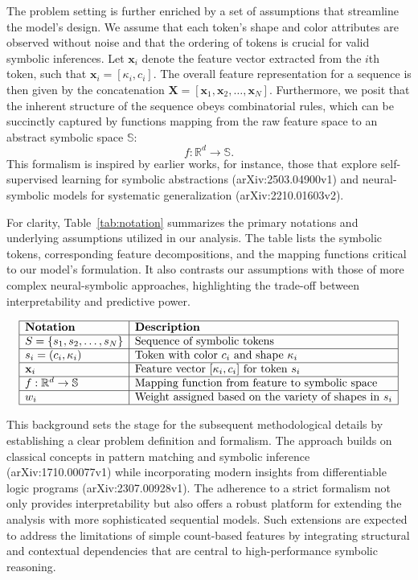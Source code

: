 \documentclass{article}
\begin{document}
The problem setting is further enriched by a set of assumptions that streamline the model’s design. We assume that each token's shape and color attributes are observed without noise and that the ordering of tokens is crucial for valid symbolic inferences. Let \( \mathbf{x}_i \) denote the feature vector extracted from the \(i\)th token, such that \( \mathbf{x}_i = [\kappa_i, c_i] \). The overall feature representation for a sequence is then given by the concatenation \( \mathbf{X} = [\mathbf{x}_1, \mathbf{x}_2, \ldots, \mathbf{x}_N] \). Furthermore, we posit that the inherent structure of the sequence obeys combinatorial rules, which can be succinctly captured by functions mapping from the raw feature space to an abstract symbolic space \(\mathbb{S}\):
\[
f: \mathbb{R}^{d} \rightarrow \mathbb{S}.
\]
This formalism is inspired by earlier works, for instance, those that explore self-supervised learning for symbolic abstractions (arXiv:2503.04900v1) and neural-symbolic models for systematic generalization (arXiv:2210.01603v2).

For clarity, Table~\ref{tab:notation} summarizes the primary notations and underlying assumptions utilized in our analysis. The table lists the symbolic tokens, corresponding feature decompositions, and the mapping functions critical to our model's formulation. It also contrasts our assumptions with those of more complex neural-symbolic approaches, highlighting the trade-off between interpretability and predictive power.

\[
\begin{array}{|l|l|}
\hline
\textbf{Notation} & \textbf{Description} \\
\hline
S = \{s_1, s_2, \ldots, s_N\} & \text{Sequence of symbolic tokens} \\
\hline
s_i = (c_i, \kappa_i) & \text{Token with color } c_i \text{ and shape } \kappa_i \\
\hline
\mathbf{x}_i & \text{Feature vector } [\kappa_i, c_i] \text{ for token } s_i \\
\hline
f: \mathbb{R}^{d} \rightarrow \mathbb{S} & \text{Mapping function from feature to symbolic space} \\
\hline
w_i & \text{Weight assigned based on the variety of shapes in } s_i \\
\hline
\end{array}
\]

This background sets the stage for the subsequent methodological details by establishing a clear problem definition and formalism. The approach builds on classical concepts in pattern matching and symbolic inference (arXiv:1710.00077v1) while incorporating modern insights from differentiable logic programs (arXiv:2307.00928v1). The adherence to a strict formalism not only provides interpretability but also offers a robust platform for extending the analysis with more sophisticated sequential models. Such extensions are expected to address the limitations of simple count-based features by integrating structural and contextual dependencies that are central to high-performance symbolic reasoning.
\end{document}
